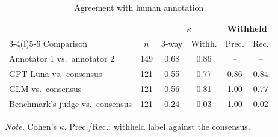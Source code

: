 \begin{table}[!t]
\caption{Agreement with human annotation}
\label{tab:human}
\centering\footnotesize
\setlength{\tabcolsep}{3pt}
\begin{tabular}{@{}lccccc@{}}
\toprule
 & & \multicolumn{2}{c}{$\kappa$} & \multicolumn{2}{c}{Withheld} \\
\cmidrule(lr){3-4}\cmidrule(l){5-6}
Comparison & $n$ & 3-way & Withh. & Prec. & Rec. \\
\midrule
Annotator 1 vs.\ annotator 2 & 149 & 0.68 & 0.86 & -- & -- \\
\midrule
GPT-Luna vs.\ consensus & 121 & 0.55 & 0.77 & 0.86 & 0.84 \\
GLM vs.\ consensus & 121 & 0.56 & 0.81 & 1.00 & 0.77 \\
Benchmark's judge vs.\ consensus & 121 & 0.24 & 0.03 & 1.00 & 0.02 \\
\bottomrule
\end{tabular}
\par\vspace{2pt}\parbox{\columnwidth}{\scriptsize\textit{Note.} Cohen's $\kappa$. Prec./Rec.: withheld label against the consensus.}
\end{table}
